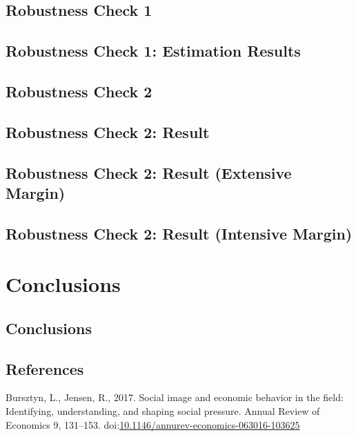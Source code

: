 \documentclass[ review  , 3p ]{elsarticle}
\begin{document}
  \hypertarget{robustness-check-1-1}{%
  \subsection{Robustness Check 1}\label{robustness-check-1-1}}
  
  \hypertarget{robustness-check-1-estimation-results}{%
  \subsection{Robustness Check 1: Estimation Results}\label{robustness-check-1-estimation-results}}
  
  \hypertarget{robustness-check-2-1}{%
  \subsection{Robustness Check 2}\label{robustness-check-2-1}}
  
  \hypertarget{robustness-check-2-result-1}{%
  \subsection{Robustness Check 2: Result}\label{robustness-check-2-result-1}}
  
  \hypertarget{robustness-check-2-result-extensive-margin}{%
  \subsection{Robustness Check 2: Result (Extensive Margin)}\label{robustness-check-2-result-extensive-margin}}
  
  \hypertarget{robustness-check-2-result-intensive-margin}{%
  \subsection{Robustness Check 2: Result (Intensive Margin)}\label{robustness-check-2-result-intensive-margin}}
  
  \hypertarget{conclusions}{%
  \section{Conclusions}\label{conclusions}}
  
  \hypertarget{conclusions-1}{%
  \subsection{Conclusions}\label{conclusions-1}}
  
  \clearpage
  
  \hypertarget{references}{%
  \subsection*{References}\label{references}}
  
  \hypertarget{refs}{}
  \leavevmode\hypertarget{ref-Bursztyn2017}{}%
  Bursztyn, L., Jensen, R., 2017. Social image and economic behavior in the field: Identifying, understanding, and shaping social pressure. Annual Review of Economics 9, 131--153. doi:\href{https://doi.org/10.1146/annurev-economics-063016-103625}{10.1146/annurev-economics-063016-103625}
\end{document}
